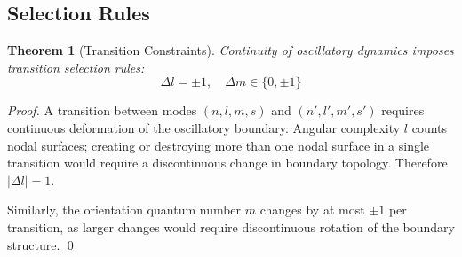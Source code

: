 \documentclass[twocolumn,10pt,a4paper]{article}
\newtheorem{theorem}{Theorem}[section]
\theoremstyle{definition}
\theoremstyle{remark}
\begin{document}
\subsection{Selection Rules}

\begin{theorem}[Transition Constraints]
\label{thm:selection}
Continuity of oscillatory dynamics imposes transition selection rules:
\begin{equation}
    \Delta l = \pm 1, \quad \Delta m \in \{0, \pm 1\}
\end{equation}
\end{theorem}

\begin{proof}
A transition between modes $(n, l, m, s)$ and $(n', l', m', s')$ requires continuous deformation of the oscillatory boundary. Angular complexity $l$ counts nodal surfaces; creating or destroying more than one nodal surface in a single transition would require a discontinuous change in boundary topology. Therefore $|\Delta l| = 1$.

Similarly, the orientation quantum number $m$ changes by at most $\pm 1$ per transition, as larger changes would require discontinuous rotation of the boundary structure. \qed
\end{proof}
\end{document}

